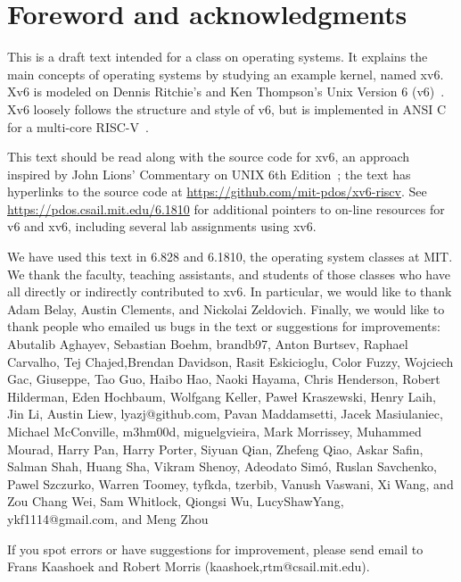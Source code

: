 \chapter*{Foreword and acknowledgments}


This is a draft text intended for a class on operating systems. It
explains the main concepts of operating systems by studying an example
kernel, named xv6.  Xv6 is modeled on Dennis Ritchie's and
Ken Thompson's Unix Version 6 (v6)~\cite{unix}.  Xv6 loosely follows the structure
and style of v6, but is implemented in ANSI C~\cite{kernighan} for 
a multi-core RISC-V~\cite{riscv}.

This text should be read along with the source code for xv6, an
approach inspired by John Lions' Commentary on UNIX 6th
Edition~\cite{lions}; the text has hyperlinks to the source code at
\url{https://github.com/mit-pdos/xv6-riscv}. See
\url{https://pdos.csail.mit.edu/6.1810} for additional pointers to
on-line resources for v6 and xv6, including several lab assignments
using xv6.

We have used this text in 6.828 and 6.1810, the operating system
classes at MIT.  We thank the faculty, teaching assistants, and
students of those classes who have all directly or indirectly
contributed to xv6.  In particular, we would like to thank Adam Belay,
Austin Clements, and Nickolai Zeldovich.  Finally, we would like to
thank people who emailed us bugs in the text or suggestions for
improvements: Abutalib Aghayev, Sebastian Boehm, brandb97, Anton
Burtsev, Raphael Carvalho, Tej Chajed,Brendan Davidson, Rasit
Eskicioglu, Color Fuzzy, Wojciech Gac, Giuseppe, Tao Guo, Haibo Hao,
Naoki Hayama, Chris Henderson, Robert Hilderman, Eden Hochbaum,
Wolfgang Keller, Paweł Kraszewski, Henry Laih, Jin Li, Austin Liew,
lyazj@github.com, Pavan Maddamsetti, Jacek Masiulaniec, Michael
McConville, m3hm00d, miguelgvieira, Mark Morrissey, Muhammed Mourad,
Harry Pan, Harry Porter, Siyuan Qian, Zhefeng Qiao, Askar Safin,
Salman Shah, Huang Sha, Vikram Shenoy, Adeodato Simó, Ruslan
Savchenko, Pawel Szczurko, Warren Toomey, tyfkda, tzerbib, Vanush
Vaswani, Xi Wang, and Zou Chang Wei, Sam Whitlock, Qiongsi Wu,
LucyShawYang, ykf1114@gmail.com, and Meng Zhou

If you spot errors or have suggestions for improvement, please send email to
Frans Kaashoek and Robert Morris (kaashoek,rtm@csail.mit.edu).
